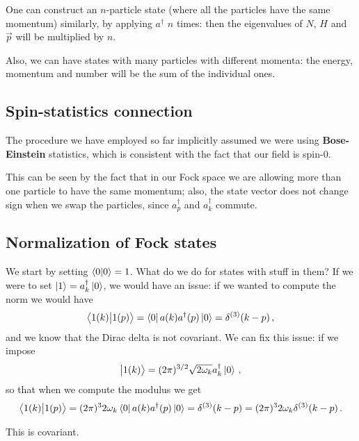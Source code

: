 \documentclass[main.tex]{subfiles}
\begin{document}
One can construct an \(n\)-particle state (where all the particles have the same momentum) similarly, by applying \(a ^\dag\) \(n\) times: then the eigenvalues of \(N\), \(H\) and \(\vec{p}\) will be multiplied by \(n\). 

Also, we can have states with many particles with different momenta: the energy, momentum and number will be the sum of the individual ones. 

\subsection{Spin-statistics connection}

The procedure we have employed so far implicitly assumed we were using \textbf{Bose-Einstein} statistics, which is consistent with the fact that our field is spin-0.

This can be seen by the fact that in our Fock space we are allowing more than one particle to have the same momentum; also, the state vector does not change sign when we swap the particles, since \(a ^\dag_{p}\) and \(a ^\dag_{k} \) commute.

\subsection{Normalization of Fock states}

We start by setting \(\braket{0}{0}= 1\).
What do we do for states with stuff in them? If we were to set \(\ket{1} = a ^\dag _k \ket{0}\), we would have an issue:  if we wanted to compute the norm we would have 
%
\begin{align}
\braket{1(k)}{1(p)} = \bra{0} a (k) a ^\dag (p) \ket{0} = \delta^{(3)} (k - p)
\,,
\end{align}
%
and we know that the Dirac delta is not covariant.
We can fix this issue: if we impose 
%
\begin{align}
\ket{1(k)} = (2 \pi )^{3/2} \sqrt{2 \omega_{k}} a ^\dag_{k} \ket{0}
\,,
\end{align}
%
so that when we compute the modulus we get 
%
\begin{align}
\braket{1(k)}{1(p)} = (2 \pi )^3 2 \omega_{k} \bra{0} a (k) a ^\dag (p) \ket{0} = \delta^{(3)} (k - p) =
(2 \pi )^3 2 \omega_{k} \delta^{(3)} (k - p)
\,.
\end{align}

\begin{claim}
This is covariant. 
\end{claim}
\end{document}
